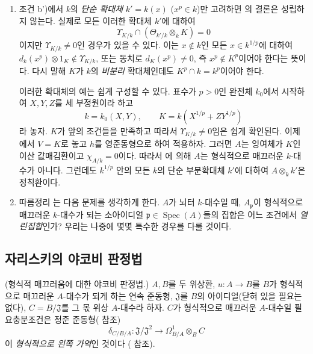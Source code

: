 \begin{remark}[22.5.10]
\label{0.22.5.10-ko}
\begin{enumerate}
  \item[\rm(i)] 조건 b')에서 $k$의 \emph{단순 확대체}
  $k'=k(x)$ ($x^p\in k$)만 고려하면 의 결론은
  성립하지 않는다. 실제로 모든 이러한 확대체 $k'$에 대하여
  \[
    \Upsilon_{K/k}\cap(\Theta_{k'/k}\otimes_kK)=0
  \]
  이지만 $\Upsilon_{K/k}\neq0$인 경우가 있을 수 있다. 이는
  $x\notin k$인 모든 $x\in k^{1/p}$에 대하여
  $d_k(x^p)\otimes1_K\notin\Upsilon_{K/k}$, 또는 동치로
  $d_K(x^p)\neq0$, 즉 $x^p\notin K^p$이어야 한다는 뜻이다. 다시 말해
  $K$가 $k$의 \emph{비분리} 확대체인데도 $K^p\cap k=k^p$이어야 한다.

  이러한 확대체의 예는 쉽게 구성할 수 있다. 표수가 $p>0$인 완전체
  $k_0$에서 시작하여 $X,Y,Z$를 세 부정원이라 하고
  \[
    k=k_0(X,Y),\qquad K=k(X^{1/p}+ZY^{1/p})
  \]
  라 놓자. $K$가 앞의 조건들을 만족하고 따라서
  $\Upsilon_{K/k}\neq0$임은 쉽게 확인된다. 이제
  에서 $V=K$로 놓고 $h$를 영준동형으로 하여
  적용하자. 그러면 $A$는 잉여체가 $K$인 이산 값매김환이고
  $\chi_{A/k}=0$이다. 따라서 에 의해 $A$는
  형식적으로 매끄러운 $k$-대수가 아니다. 그런데도 $k^{1/p}$ 안의
  모든 $k$의 단순 부분확대체 $k'$에 대하여 $A\otimes_kk'$은
  정칙환이다.


  \item[\rm(ii)] 따름정리 는 다음 문제를 생각하게
  한다. $A$가 뇌터 $k$-대수일 때, $A_{\mathfrak p}$이 형식적으로
  매끄러운 $k$-대수가 되는 소아이디얼
  $\mathfrak p\in\operatorname{Spec}(A)$들의 집합은 어느 조건에서
  \emph{열린집합}인가? 우리는 나중에 몇몇 특수한 경우를 다룰 것이다.
\end{enumerate}
\end{remark}

\subsection{자리스키의 야코비 판정법}
\label{subsection:0.22.6-ko}

\begin{theorem}[22.6.1]
\label{0.22.6.1-ko}
\textnormal{(형식적 매끄러움에 대한 야코비 판정법.)}
$A,B$를 두 위상환, $u:A\longrightarrow B$를 $B$가 형식적으로
매끄러운 $A$-대수가 되게 하는 연속 준동형, $\mathfrak J$를 $B$의
아이디얼(닫혀 있을 필요는 없다), $C=B/\mathfrak J$를 그 몫 위상
$A$-대수라 하자. $C$가 형식적으로 매끄러운 $A$-대수일 필요충분조건은
정준 준동형( 참조)
\begin{equation}
\label{0.22.6.1.1-ko}
  \delta_{C/B/A}:\mathfrak J/\mathfrak J^2
  \longrightarrow\Omega^1_{B/A}\otimes_BC
  \tag{22.6.1.1}
\end{equation}
이 \emph{형식적으로 왼쪽 가역}인 것이다
( 참조).
\end{theorem}

